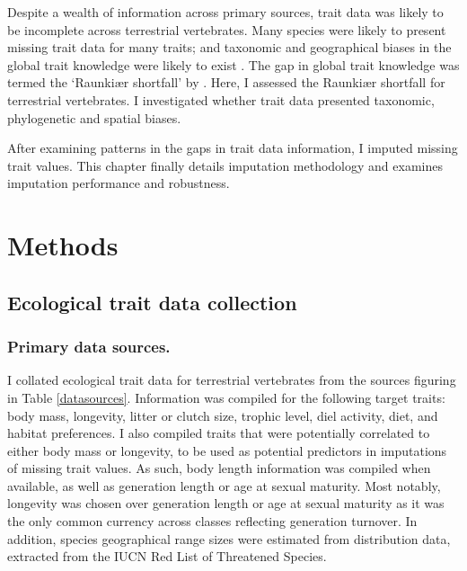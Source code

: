 Despite a wealth of information across primary sources, trait data was likely to be incomplete across terrestrial vertebrates. Many species were likely to present missing trait data for many traits; and taxonomic and geographical biases in the global trait knowledge were likely to exist \citep{Hortal2014, Gonzalez-Suarez2012}. The gap in global trait knowledge was termed the `Raunki{\ae}r shortfall' by \citet{Hortal2014}. Here, I assessed the Raunki{\ae}r shortfall for terrestrial vertebrates. I investigated whether trait data presented taxonomic, phylogenetic and spatial biases.  

After examining patterns in the gaps in trait data information, I imputed missing trait values. This chapter finally details imputation methodology and examines imputation performance and robustness.



\section{Methods}

\subsection{Ecological trait data collection}

\subsubsection{Primary data sources.}
I collated ecological trait data for terrestrial vertebrates from the sources figuring in Table \ref{datasources}. Information was compiled for the following target traits: body mass, longevity, litter or clutch size, trophic level, diel activity, diet, and habitat preferences. I also compiled traits that were potentially correlated to either body mass or longevity, to be used as potential predictors in imputations of missing trait values. As such, body length information was compiled when available, as well as generation length or age at sexual maturity. Most notably, longevity was chosen over generation length or age at sexual maturity as it was the only common currency across classes reflecting generation turnover. In addition, species geographical range sizes were estimated from distribution data, extracted from the IUCN Red List of Threatened Species.

